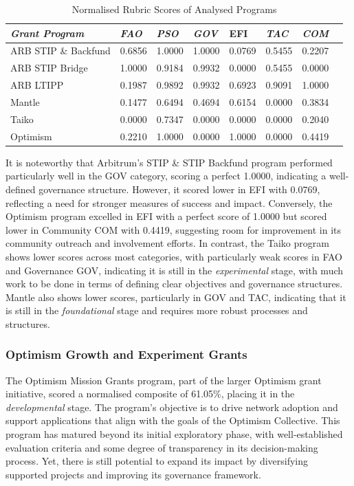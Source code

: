 \documentclass[conference]{IEEEtran}
\begin{document}
\begin{table}[htbp]
\caption{Normalised Rubric Scores of Analysed Programs}
\begin{center}
\footnotesize
\begin{tabular}{p{2.9cm}p{0.5cm}p{0.5cm}p{0.5cm}p{0.5cm}p{0.5cm}p{0.5cm}p{0.5cm}}
\hline
\textbf{\textit{Grant Program}} & \textbf{\textit{FAO}} & \textbf{\textit{PSO}} & \textbf{\textit{GOV}} & \textbf{EFI} & \textbf{\textit{TAC}} & \textbf{\textit{COM}} \\
\hline
ARB STIP \& Backfund & 0.6856 & 1.0000 & 1.0000 & 0.0769 & 0.5455 & 0.2207 \\
ARB STIP Bridge & 1.0000 & 0.9184 & 0.9932 & 0.0000 & 0.5455 & 0.0000 \\
ARB LTIPP & 0.1987 & 0.9892 & 0.9932 & 0.6923 & 0.9091 & 1.0000 \\
Mantle & 0.1477 & 0.6494 & 0.4694 & 0.6154 & 0.0000 & 0.3834 \\
Taiko & 0.0000 & 0.7347 & 0.0000 & 0.0000 & 0.0000 & 0.2040 \\
Optimism & 0.2210 & 1.0000 & 0.0000 & 1.0000 & 0.0000 & 0.4419 \\
\hline
\end{tabular}
\end{center}
\label{tab:rubric_scores}
\end{table}

It is noteworthy that Arbitrum's STIP \& STIP Backfund program performed particularly well in the GOV category, scoring a perfect 1.0000, indicating a well-defined governance structure. However, it scored lower in EFI with 0.0769, reflecting a need for stronger measures of success and impact. Conversely, the Optimism program excelled in EFI with a perfect score of 1.0000 but scored lower in Community COM with 0.4419, suggesting room for improvement in its community outreach and involvement efforts. In contrast, the Taiko program shows lower scores across most categories, with particularly weak scores in FAO and Governance GOV, indicating it is still in the \textit{experimental} stage, with much work to be done in terms of defining clear objectives and governance structures. Mantle also shows lower scores, particularly in GOV and TAC, indicating that it is still in the \textit{foundational} stage and requires more robust processes and structures.

\subsubsection{Optimism Growth and Experiment Grants}\label{sec_4.2.1}
The Optimism Mission Grants program, part of the larger Optimism grant initiative, scored a normalised composite of 61.05\%, placing it in the \textit{developmental} stage. The program’s objective is to drive network adoption and support applications that align with the goals of the Optimism Collective. This program has matured beyond its initial exploratory phase, with well-established evaluation criteria and some degree of transparency in its decision-making process. Yet, there is still potential to expand its impact by diversifying supported projects and improving its governance framework.
\end{document}
